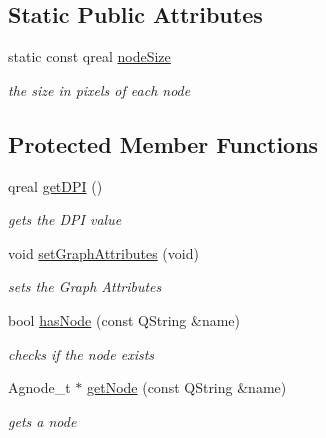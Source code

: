 \subsection*{\-Static \-Public \-Attributes}
\begin{DoxyCompactItemize}
\item 
\hypertarget{class_g_v_sub_graph_acad7d627217c64966125e7701142c40b}{static const qreal \hyperlink{class_g_v_sub_graph_acad7d627217c64966125e7701142c40b}{node\-Size}}\label{class_g_v_sub_graph_acad7d627217c64966125e7701142c40b}

\begin{DoxyCompactList}\small\item\em the size in pixels of each node \end{DoxyCompactList}\end{DoxyCompactItemize}
\subsection*{\-Protected \-Member \-Functions}
\begin{DoxyCompactItemize}
\item 
qreal \hyperlink{class_g_v_sub_graph_a0405ca939a02f54ccdf044a5a6f4ff6b}{get\-D\-P\-I} ()
\begin{DoxyCompactList}\small\item\em gets the \-D\-P\-I value \end{DoxyCompactList}\item 
\hypertarget{class_g_v_sub_graph_a6f94775bfde0ef47c59df8a7e6510aaf}{void \hyperlink{class_g_v_sub_graph_a6f94775bfde0ef47c59df8a7e6510aaf}{set\-Graph\-Attributes} (void)}\label{class_g_v_sub_graph_a6f94775bfde0ef47c59df8a7e6510aaf}

\begin{DoxyCompactList}\small\item\em sets the \-Graph \-Attributes \end{DoxyCompactList}\item 
bool \hyperlink{class_g_v_sub_graph_af55511f05fe4d65e122cc77c2d02a706}{has\-Node} (const \-Q\-String \&name)
\begin{DoxyCompactList}\small\item\em checks if the node exists \end{DoxyCompactList}\item 
\-Agnode\-\_\-t $\ast$ \hyperlink{class_g_v_sub_graph_aaa1df9ed6bbd2ea697646e8bbfb571da}{get\-Node} (const \-Q\-String \&name)
\begin{DoxyCompactList}\small\item\em gets a node \end{DoxyCompactList}\end{DoxyCompactItemize}
